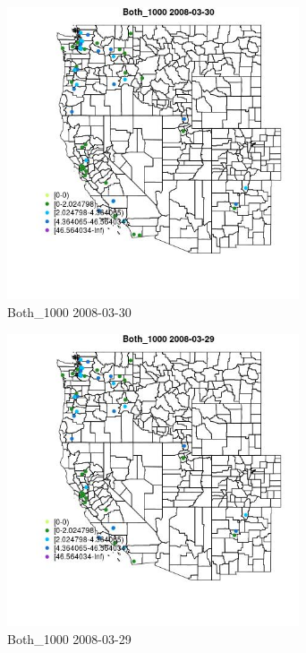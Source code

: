 \begin{figure} 
\centering  
\includegraphics[width=0.77\textwidth]{Code_Outputs/Report_ML_input_PM25_Step4_part_e_de_duplicated_aves_MapObsBoth_10002008-03-30.jpg} 
\caption{\label{fig:Report_ML_input_PM25_Step4_part_e_de_duplicated_avesMapObsBoth_10002008-03-30}Both_1000 2008-03-30} 
\end{figure} 
 

\begin{figure} 
\centering  
\includegraphics[width=0.77\textwidth]{Code_Outputs/Report_ML_input_PM25_Step4_part_e_de_duplicated_aves_MapObsBoth_10002008-03-29.jpg} 
\caption{\label{fig:Report_ML_input_PM25_Step4_part_e_de_duplicated_avesMapObsBoth_10002008-03-29}Both_1000 2008-03-29} 
\end{figure} 
 

